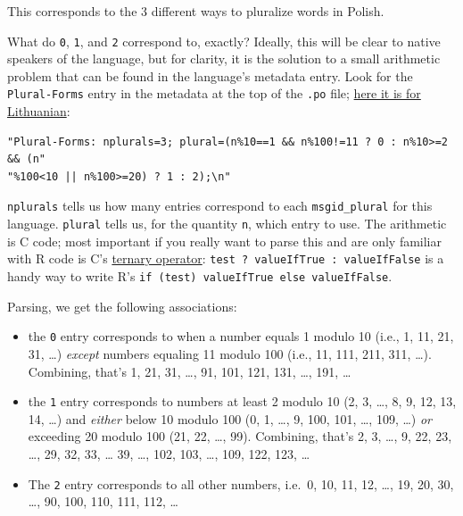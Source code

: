 \documentclass[
]{book}
\providecommand{\tightlist}{%
  \setlength{\itemsep}{0pt}\setlength{\parskip}{0pt}}
\begin{document}
This corresponds to the 3 different ways to pluralize words in Polish.

What do \texttt{0}, \texttt{1}, and \texttt{2} correspond to, exactly? Ideally, this will be clear to native speakers of the language, but for
clarity, it is the solution to a small arithmetic problem that can be found in the language's metadata entry. Look for the
\texttt{Plural-Forms} entry in the metadata at the top of the \texttt{.po} file;
\href{https://github.com/r-devel/r-svn/blob/c715d61cb74b3fee2d035faed9b258e86e420b75/src/library/base/po/R-lt.po\#L18-L19}{here it is for Lithuanian}:

\begin{verbatim}
"Plural-Forms: nplurals=3; plural=(n%10==1 && n%100!=11 ? 0 : n%10>=2 && (n"
"%100<10 || n%100>=20) ? 1 : 2);\n"
\end{verbatim}

\texttt{nplurals} tells us how many entries correspond to each \texttt{msgid\_plural} for this language. \texttt{plural} tells us, for the
quantity \texttt{n}, which entry to use. The arithmetic is C code; most important if you really want to parse this and are only
familiar with R code is C's \href{https://en.wikipedia.org/wiki/\%3F:}{ternary operator}: \texttt{test\ ?\ valueIfTrue\ :\ valueIfFalse}
is a handy way to write R's \texttt{if\ (test)\ valueIfTrue\ else\ valueIfFalse}.

Parsing, we get the following associations:

\begin{itemize}
\tightlist
\item
  the \texttt{0} entry corresponds to when a number equals 1 modulo 10 (i.e., 1, 11, 21, 31, \ldots) \emph{except} numbers equaling
  11 modulo 100 (i.e., 11, 111, 211, 311, \ldots). Combining, that's 1, 21, 31, \ldots, 91, 101, 121, 131, \ldots, 191, \ldots{}
\item
  the \texttt{1} entry corresponds to numbers at least 2 modulo 10 (2, 3, \ldots, 8, 9, 12, 13, 14, \ldots) and \emph{either}
  below 10 modulo 100 (0, 1, \ldots, 9, 100, 101, \ldots, 109, \ldots) \emph{or} exceeding 20 modulo 100 (21, 22, \ldots, 99). Combining,
  that's 2, 3, \ldots, 9, 22, 23, \ldots, 29, 32, 33, \ldots{} 39, \ldots, 102, 103, \ldots, 109, 122, 123, \ldots{}
\item
  The \texttt{2} entry corresponds to all other numbers, i.e.~0, 10, 11, 12, \ldots, 19, 20, 30, \ldots, 90, 100, 110, 111, 112, \ldots{}
\end{itemize}
\end{document}
